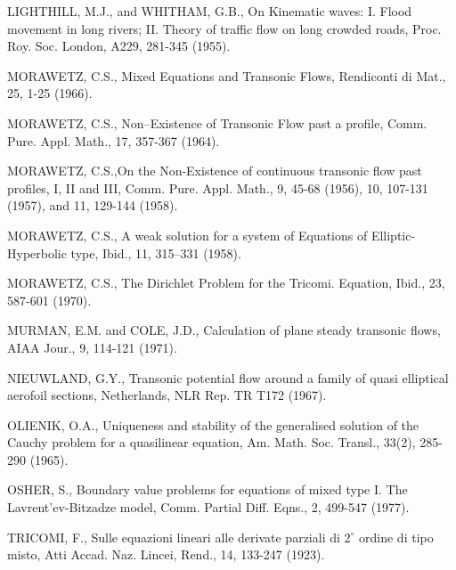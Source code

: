 \begin{thebibliography}{99}
 LIGHTHILL, M.J., and WHITHAM, G.B., On Kinematic waves: I. Flood movement in long rivers; II. Theory of traffic flow on long crowded roads, Proc. Roy. Soc. London, A229, 281-345 (1955).

 MORAWETZ, C.S., Mixed Equations and Transonic Flows, Rendiconti di Mat., 25, 1-25 (1966).

 MORAWETZ, C.S., Non--Existence of Transonic Flow past a profile, Comm. Pure. Appl. Math., 17, 357-367 (1964).

 MORAWETZ, C.S.,\pageoriginale On the Non-Existence of continuous transonic flow past profiles, I, II and III, Comm. Pure. Appl. Math., 9, 45-68 (1956), 10, 107-131 (1957), and 11, 129-144 (1958).

  MORAWETZ, C.S., A weak solution for a system of Equations of Elliptic-Hyperbolic type, Ibid., 11, 315--331 (1958).

 MORAWETZ, C.S., The Dirichlet Problem for the Tricomi. Equation, Ibid., 23, 587-601 (1970).

 MURMAN, E.M. and COLE, J.D., Calculation of plane steady transonic flows, AIAA Jour., 9, 114-121 (1971).

 NIEUWLAND, G.Y., Transonic potential flow around a family of quasi elliptical aerofoil sections, Netherlands, NLR Rep. TR T172 (1967).

 OLIENIK, O.A., Uniqueness and stability of the generalised solution of the Cauchy problem for a quasilinear equation, Am. Math. Soc. Transl., 33(2), 285-290 (1965).

 OSHER, S., Boundary value problems for equations of mixed type I. The Lavrent'ev-Bitzadze  model, Comm. Partial Diff. Eqns., 2, 499-547 (1977).

 TRICOMI, F., Sulle equazioni lineari alle derivate parziali di $2^\circ$ ordine di tipo misto, Atti Accad. Naz. Lincei, Rend., 14, 133-247 (1923). 
\end{thebibliography}
